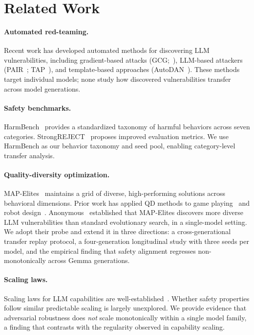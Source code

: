 \documentclass{article}
\begin{document}
\section{Related Work}
\label{sec:related}

\paragraph{Automated red-teaming.}
Recent work has developed automated methods for discovering LLM
vulnerabilities, including gradient-based attacks
(GCG;~\cite{zou2023universal}), LLM-based attackers
(PAIR~\cite{chao2023jailbreaking}; TAP~\cite{mehrotra2024tree}),
and template-based approaches (AutoDAN~\cite{liu2024autodan}).
These methods target individual models; none study how discovered
vulnerabilities transfer across model generations.

\paragraph{Safety benchmarks.}
HarmBench~\cite{mazeika2024harmbench} provides a standardized taxonomy
of harmful behaviors across seven categories.
StrongREJECT~\cite{souly2024strongreject} proposes improved evaluation
metrics. We use HarmBench as our behavior taxonomy and seed pool,
enabling category-level transfer analysis.

\paragraph{Quality-diversity optimization.}
MAP-Elites~\cite{mouret2015illuminating} maintains a grid of diverse,
high-performing solutions across behavioral dimensions. Prior work has
applied QD methods to game playing~\cite{fontaine2020covariance} and
robot design~\cite{cully2015robots}.
Anonymous~\cite{anonymous2026qd} established that MAP-Elites discovers
more diverse LLM vulnerabilities than standard evolutionary search,
in a single-model setting. We adopt their probe and extend it in
three directions: a cross-generational transfer replay protocol,
a four-generation longitudinal study with three seeds per model,
and the empirical finding that safety alignment regresses
non-monotonically across Gemma generations.

\paragraph{Scaling laws.}
Scaling laws for LLM capabilities are well-established~\cite{kaplan2020scaling,
hoffmann2022training}. Whether safety properties follow similar predictable
scaling is largely unexplored. We provide evidence that adversarial
robustness does \emph{not} scale monotonically within a single model
family, a finding that contrasts with the regularity observed in
capability scaling.
\end{document}
